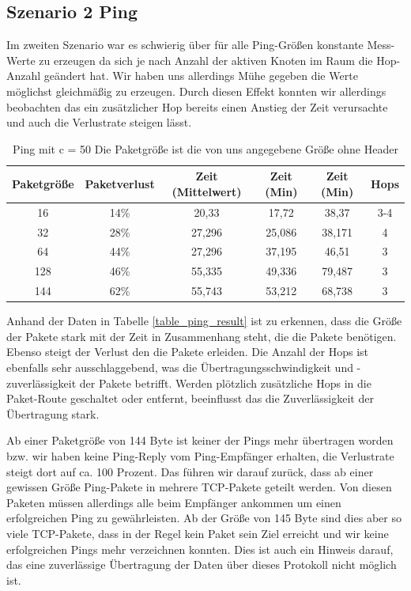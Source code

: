 \documentclass[]{scrartcl}
\begin{document}
\subsection{Szenario 2 Ping}

Im zweiten Szenario war es schwierig über für alle Ping-Größen konstante Mess-Werte zu erzeugen da sich je nach Anzahl der aktiven Knoten im Raum die Hop-Anzahl geändert hat. Wir haben uns allerdings Mühe gegeben die Werte möglichst gleichmäßig zu erzeugen. Durch diesen Effekt konnten wir allerdings beobachten das ein zusätzlicher Hop bereits einen Anstieg der Zeit verursachte und auch die Verlustrate steigen lässt.

\begin{table}[H]
\centering
\begin{tabular}{|c|c|c|c|c|c|}
  \hline
  \textbf{Paketgröße} & \textbf{Paketverlust} & \textbf{Zeit (Mittelwert)} & \textbf{Zeit (Min)} & \textbf{Zeit (Min)} & \textbf{Hops} \\
  \hline
   16 & 14\% & 20,33 & 17,72 & 38,37 & 3-4\\
  \hline
   32 & 28\% & 27,296 & 25,086 & 38,171 & 4\\
  \hline
   64 & 44\% & 27,296 & 37,195 & 46,51 & 3\\
  \hline
   128 & 46\% & 55,335 & 49,336 & 79,487 & 3\\
  \hline
   144 & 62\% & 55,743 & 53,212 & 68,738 & 3\\
  \hline
\end{tabular}
	\caption{Ping mit c = 50 Die Paketgröße ist die von uns angegebene Größe ohne Header}
	\label{table_ping_result_scenario2}
\end{table}

Anhand der Daten in Tabelle \ref{table_ping_result} ist zu erkennen, dass die Größe der Pakete stark mit der Zeit in Zusammenhang steht, die die Pakete benötigen. Ebenso steigt der Verlust den die Pakete erleiden. Die Anzahl der Hops ist ebenfalls sehr ausschlaggebend, was die Übertragungsschwindigkeit und -zuverlässigkeit der Pakete betrifft. Werden plötzlich zusätzliche Hops in die Paket-Route geschaltet oder entfernt, beeinflusst das die Zuverlässigkeit der Übertragung stark.

Ab einer Paketgröße von 144 Byte ist keiner der Pings mehr übertragen worden bzw. wir haben keine Ping-Reply vom Ping-Empfänger erhalten, die Verlustrate steigt dort auf ca. 100 Prozent. Das führen wir darauf zurück, dass ab einer gewissen Größe Ping-Pakete in mehrere TCP-Pakete geteilt werden. Von diesen Paketen müssen allerdings alle beim Empfänger ankommen um einen erfolgreichen Ping zu gewährleisten. Ab der Größe von 145 Byte sind dies aber so viele TCP-Pakete, dass in der Regel kein Paket sein Ziel erreicht und wir keine erfolgreichen Pings mehr verzeichnen konnten. Dies ist auch ein Hinweis darauf, das eine zuverlässige Übertragung der Daten über dieses Protokoll nicht möglich ist.
\end{document}
